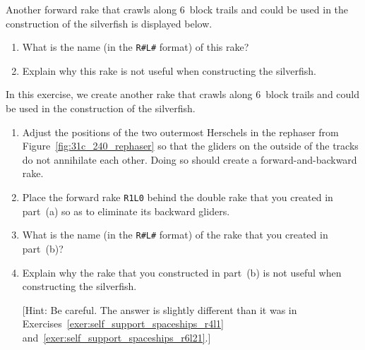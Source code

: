 \begin{multicols}{2}
\mfilbreak


\begin{problem}\label{exer:self_support_spaceships_r6l21}
	Another forward rake that crawls along $6$~block trails and could be used in the construction of the silverfish is displayed below.
	\begin{center}
	\end{center}
	
	\begin{enumerate}[label=\bf\color{ocre}(\alph*)]
		\item What is the name (in the \texttt{R\#L\#} format) of this rake?
		
		\item Explain why this rake is not useful when constructing the silverfish.
	\end{enumerate}
\end{problem}


\mfilbreak


\begin{problem}\label{exer:self_support_spaceships_r2l16}
	In this exercise, we create another rake that crawls along $6$~block trails and could be used in the construction of the silverfish.
	
	\begin{enumerate}[label=\bf\color{ocre}(\alph*)]
		\item Adjust the positions of the two outermost Herschels in the rephaser from Figure~\ref{fig:31c_240_rephaser} so that the gliders on the outside of the tracks do not annihilate each other. Doing so should create a forward-and-backward rake.
		
		\item Place the forward rake \texttt{R1L0} behind the double rake that you created in part~(a) so as to eliminate its backward gliders.
		
		\item What is the name (in the \texttt{R\#L\#} format) of the rake that you created in part~(b)?
		
		\item Explain why the rake that you constructed in part~(b) is not useful when constructing the silverfish.
		
		[Hint: Be careful. The answer is slightly different than it was in Exercises~\ref{exer:self_support_spaceships_r4l1} and~\ref{exer:self_support_spaceships_r6l21}.]
	\end{enumerate}
\end{problem}


\end{multicols}
